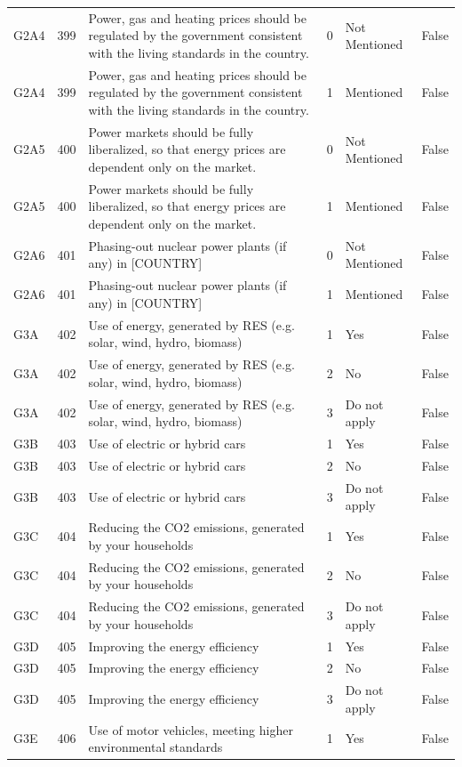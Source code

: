 \begin{tabular}{lrlllr}
G2A4 & 399 & Power, gas and heating prices should be regulated by the government consistent with the living standards in the country. & 0 & Not Mentioned & False \\
G2A4 & 399 & Power, gas and heating prices should be regulated by the government consistent with the living standards in the country. & 1 & Mentioned & False \\
G2A5 & 400 & Power markets should be fully liberalized, so that energy prices are dependent only on the market. & 0 & Not Mentioned & False \\
G2A5 & 400 & Power markets should be fully liberalized, so that energy prices are dependent only on the market. & 1 & Mentioned & False \\
G2A6 & 401 & Phasing-out nuclear power plants (if any) in [COUNTRY]  & 0 & Not Mentioned & False \\
G2A6 & 401 & Phasing-out nuclear power plants (if any) in [COUNTRY]  & 1 & Mentioned & False \\
G3A & 402 & Use of energy, generated by RES (e.g. solar, wind, hydro, biomass) & 1 & Yes & False \\
G3A & 402 & Use of energy, generated by RES (e.g. solar, wind, hydro, biomass) & 2 & No & False \\
G3A & 402 & Use of energy, generated by RES (e.g. solar, wind, hydro, biomass) & 3 & Do not apply & False \\
G3B & 403 & Use of electric or hybrid cars & 1 & Yes & False \\
G3B & 403 & Use of electric or hybrid cars & 2 & No & False \\
G3B & 403 & Use of electric or hybrid cars & 3 & Do not apply & False \\
G3C & 404 & Reducing the CO2 emissions, generated by your households & 1 & Yes & False \\
G3C & 404 & Reducing the CO2 emissions, generated by your households & 2 & No & False \\
G3C & 404 & Reducing the CO2 emissions, generated by your households & 3 & Do not apply & False \\
G3D & 405 & Improving the energy efficiency & 1 & Yes & False \\
G3D & 405 & Improving the energy efficiency & 2 & No & False \\
G3D & 405 & Improving the energy efficiency & 3 & Do not apply & False \\
G3E & 406 & Use of motor vehicles, meeting higher environmental standards & 1 & Yes & False \\

\end{tabular}
